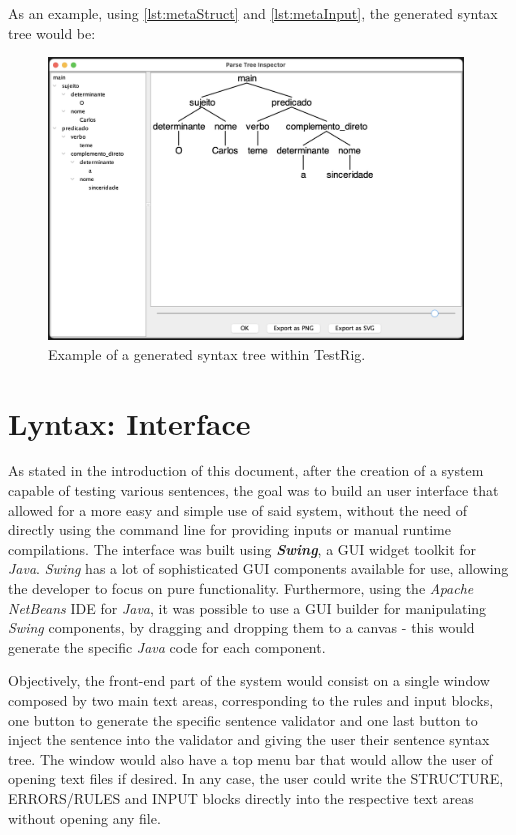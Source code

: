 \newpage
\noindent As an example, using \autoref{lst:metaStruct} and \autoref{lst:metaInput}, the generated syntax tree would be:
\begin{figure}[h]
    \centering
    \includegraphics[width=11cm]{images/testrig_gui_example.png}
    \caption{Example of a generated syntax tree within TestRig.}
    \label{fig:testrigGuiExample}
\end{figure}

\section{Lyntax: Interface}

As stated in the introduction of this document, after the creation of a system capable of testing various sentences, the goal was to build an user interface
that allowed for a more easy and simple use of said system, without the need of directly using the command line for providing inputs or manual runtime compilations.
The interface was built using \emph{\textbf{Swing}}, a GUI widget toolkit for \emph{Java}.
\emph{Swing} has a lot of sophisticated GUI components available for use, allowing the developer to focus on pure functionality.
Furthermore, using the \emph{Apache NetBeans} IDE for \emph{Java}, it was possible to use a GUI builder for manipulating \emph{Swing} components, 
by dragging and dropping them to a canvas - this would generate the specific \emph{Java} code for each component.

Objectively, the front-end part of the system would consist on a single window composed by two main text areas, corresponding to the rules and input blocks,
one button to generate the specific sentence validator and one last button to inject the sentence into the validator and giving the user their sentence syntax tree.
The window would also have a top menu bar that would allow the user of opening text files if desired.
In any case, the user could write the STRUCTURE, ERRORS/RULES and INPUT blocks directly into the respective text areas without opening any file. 

